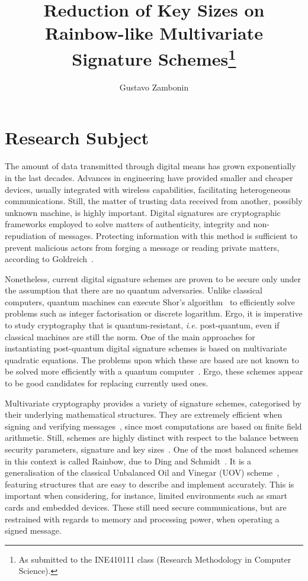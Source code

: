 \documentclass[10pt]{article}
\title{Reduction of Key Sizes on Rainbow-like Multivariate Signature Schemes\footnote{
    As submitted to the INE410111 class (Research Methodology in Computer Science).}}
\author{Gustavo Zambonin\inst{1}}
\begin{document}
 

\maketitle

\section{Research Subject}

The amount of data transmitted through digital means has grown exponentially in the last decades. Advances in engineering have provided smaller and cheaper devices, usually integrated with wireless capabilities, facilitating heterogeneous communications. Still, the matter of trusting data received from another, possibly unknown machine, is highly important. Digital signatures are cryptographic frameworks employed to solve matters of authenticity, integrity and non-repudiation of messages. Protecting information with this method is sufficient to prevent malicious actors from forging a message or reading private matters, according to Goldreich~\cite{Goldreich:book:2004}.

Nonetheless, current digital signature schemes are proven to be secure only under the assumption that there are no quantum adversaries. Unlike classical computers, quantum machines can execute Shor's algorithm~\cite{Shor:article:1997:oct} to efficiently solve problems such as integer factorisation or discrete logarithm. Ergo, it is imperative to study cryptography that is quantum-resistant, \emph{i.e.} post-quantum, even if classical machines are still the norm. One of the main approaches for instantiating post-quantum digital signature schemes is based on multivariate quadratic equations. The problems upon which these are based are not known to be solved more efficiently with a quantum computer~\cite{Bernstein:book:2008}. Ergo, these schemes appear to be good candidates for replacing currently used ones.

Multivariate cryptography provides a variety of signature schemes, categorised by their underlying mathematical structures. They are extremely efficient when signing and verifying messages~\cite{Ding:book:2006}, since most computations are based on finite field arithmetic. Still, schemes are highly distinct with respect to the balance between security parameters, signature and key sizes~\cite{Ding:article:2017:jul}. One of the most balanced schemes in this context is called Rainbow, due to Ding and Schmidt~\cite{Ding:inproc:2005:jun}. It is a generalisation of the classical Unbalanced Oil and Vinegar (UOV) scheme~\cite{Kipnis:inproc:1999:apr}, featuring structures that are easy to describe and implement accurately. This is important when considering, for instance, limited environments such as smart cards and embedded devices. These still need secure communications, but are restrained with regards to memory and processing power, when operating a signed message.
\end{document}
